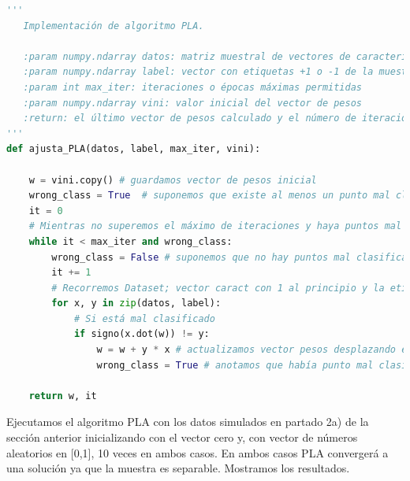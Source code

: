\documentclass[11pt,a4paper]{article}
\theoremstyle{definition}
\begin{document}
    \begin{lstlisting}[language=Python, caption= Implementaci\'on de algoritmo PLA en Python, inputencoding=latin1]
  '''
   Implementación de algoritmo PLA. 
   
   :param numpy.ndarray datos: matriz muestral de vectores de características con 1s en primera columna
   :param numpy.ndarray label: vector con etiquetas +1 o -1 de la muestra
   :param int max_iter: iteraciones o épocas máximas permitidas
   :param numpy.ndarray vini: valor inicial del vector de pesos
   :return: el último vector de pesos calculado y el número de iteraciones realizadas
'''
def ajusta_PLA(datos, label, max_iter, vini):
    
    w = vini.copy() # guardamos vector de pesos inicial
    wrong_class = True  # suponemos que existe al menos un punto mal clasificado
    it = 0 
    # Mientras no superemos el máximo de iteraciones y haya puntos mal clasificados
    while it < max_iter and wrong_class:
        wrong_class = False # suponemos que no hay puntos mal clasificados
        it += 1
        # Recorremos Dataset; vector caract con 1 al principio y la etiqueta asociada al v. características
        for x, y in zip(datos, label):
            # Si está mal clasificado
            if signo(x.dot(w)) != y:
                w = w + y * x # actualizamos vector pesos desplazando en la dirección correcta
                wrong_class = True # anotamos que había punto mal clasificado
        
    return w, it
	\end{lstlisting}
		Ejecutamos el algoritmo PLA con los datos simulados en partado 2a) de la sección anterior inicializando con el vector cero y, con vector de números aleatorios en [0,1], 10 veces en ambos casos. En ambos casos PLA convergerá a una solución ya que la muestra es separable. Mostramos los resultados.
\end{document}
